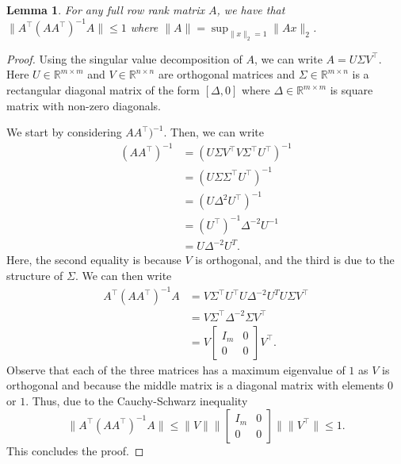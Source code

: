 \documentclass{article}
\newtheorem{lemma}[theorem]{Lemma}
\begin{document}
\begin{lemma}
	\label{lemma:norm_bound}
	For any full row rank matrix \(A\), we have that \(\|A^{\top}(A A^{\top})^{-1}A\| \leq 1\) where \(\|A\| = \sup_{\|x\|_2 = 1} \|A x\|_2\). 
\end{lemma}
\begin{proof}%
	Using the singular value decomposition of \(A\), we can write \(A = U \Sigma V^{\top}\). 
	Here \(U \in \mathbb{R}^{m \times m}\) and \(V \in \mathbb{R}^{n \times n}\) are orthogonal matrices and \(\Sigma \in \mathbb{R}^{m \times n}\) is a rectangular diagonal matrix of the form \([\Delta, 0]\) where \(\Delta \in \mathbb{R}^{m \times m}\) is square matrix with non-zero diagonals. 
	
	We start by considering \(A A^{\top})^{-1}\). 
	Then, we can write 
	\begin{align*}
		(A A^{\top})^{-1} &= (U \Sigma V^{\top}V \Sigma^{\top} U^{\top})^{-1}\\
		&= (U \Sigma \Sigma^{\top} U^{\top})^{-1}\\
		&= (U \Delta^2 U^{\top})^{-1}\\
		&= (U^{\top})^{-1} \Delta^{-2} U^{-1}\\
		&= U \Delta^{-2} U^{T}.
	\end{align*}
	Here, the second equality is because \(V\) is orthogonal, and the third is due to the structure of \(\Sigma\).
	We can then write 
	\begin{align*}
		A^{\top}(A A^{\top})^{-1}A &= V \Sigma^{\top} U^{\top} U \Delta^{-2} U^{T} U \Sigma V^{\top}\\
		&= V \Sigma^{\top} \Delta^{-2} \Sigma V^{\top}\\
		&= V \begin{bmatrix} I_m & 0 \\ 0 & 0 \end{bmatrix} V^{\top}.
	\end{align*}
	Observe that each of the three matrices has a maximum eigenvalue of \(1\) as \(V\) is orthogonal and because the middle matrix is a diagonal matrix with elements \(0\) or \(1\). 
	Thus, due to the Cauchy-Schwarz inequality
	\[
	\|A^{\top}(A A^{\top})^{-1}A\| \leq \|V\|\|\begin{bmatrix} I_m & 0 \\ 0 & 0 \end{bmatrix}\|\|V^{\top}\| \leq 1.
	\]
	This concludes the proof.
\end{proof}
\end{document}

